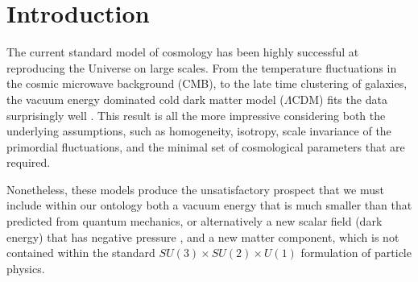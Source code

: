 \documentclass[iop]{emulateapj}
\begin{document}




\section{Introduction}

The current standard model of cosmology has been highly successful at reproducing the Universe on large scales. %
From the temperature fluctuations in the cosmic microwave background (CMB), 
to the late time clustering of galaxies, 
the vacuum energy dominated cold dark matter model ($\Lambda$CDM) fits the data surprisingly well \citep{Planck2015,Anderson2013}. 
This result is all the more impressive considering both the underlying assumptions, 
such as homogeneity, isotropy, scale invariance of the primordial fluctuations, 
and the minimal set of cosmological parameters that are required.

Nonetheless, these models produce the unsatisfactory prospect that we must include within our ontology both a vacuum energy 
that is much smaller than that predicted from  quantum mechanics, 
or alternatively a new scalar field (dark energy) that has negative pressure
\citep{SW1989,Riess1998,Perl1999,PR2003,Li2011}, 
and a new matter component, which is not contained within the standard $SU(3)\times SU(2) \times U(1)$ formulation of particle physics.
\end{document}
